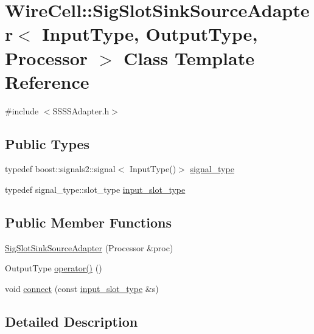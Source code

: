 \hypertarget{class_wire_cell_1_1_sig_slot_sink_source_adapter}{}\section{Wire\+Cell\+:\+:Sig\+Slot\+Sink\+Source\+Adapter$<$ Input\+Type, Output\+Type, Processor $>$ Class Template Reference}
\label{class_wire_cell_1_1_sig_slot_sink_source_adapter}


{\ttfamily \#include $<$S\+S\+S\+S\+Adapter.\+h$>$}

\subsection*{Public Types}
\begin{DoxyCompactItemize}
\item 
typedef boost\+::signals2\+::signal$<$ Input\+Type()$>$ \hyperlink{class_wire_cell_1_1_sig_slot_sink_source_adapter_a40ff5e7ed8db807246a7f1c77ee46a58}{signal\+\_\+type}
\item 
typedef signal\+\_\+type\+::slot\+\_\+type \hyperlink{class_wire_cell_1_1_sig_slot_sink_source_adapter_ab53f4d64b24e8ff5bc0f7ebd3ceca7dc}{input\+\_\+slot\+\_\+type}
\end{DoxyCompactItemize}
\subsection*{Public Member Functions}
\begin{DoxyCompactItemize}
\item 
\hyperlink{class_wire_cell_1_1_sig_slot_sink_source_adapter_a9a6e0e1a49b753d56dbf1a8417b661c9}{Sig\+Slot\+Sink\+Source\+Adapter} (Processor \&proc)
\item 
Output\+Type \hyperlink{class_wire_cell_1_1_sig_slot_sink_source_adapter_aff6b867ecd4cd3e387b0a4d75a7484d7}{operator()} ()
\item 
void \hyperlink{class_wire_cell_1_1_sig_slot_sink_source_adapter_a7a0f80852f4df14504bf89b56b23ba48}{connect} (const \hyperlink{class_wire_cell_1_1_sig_slot_sink_source_adapter_ab53f4d64b24e8ff5bc0f7ebd3ceca7dc}{input\+\_\+slot\+\_\+type} \&s)
\end{DoxyCompactItemize}


\subsection{Detailed Description}
